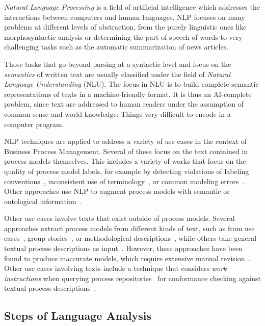 \emph{Natural Language Processing} is a field of artificial intelligence which
addresses the interactions between computers and human languages. NLP focuses on
many problems at different levels of abstraction, from the purely linguistic
ones like morphosyntactic analysis or determining the part-of-speech of words
to very challenging tasks such as the automatic summarization of news articles.

Those tasks that go beyond parsing at a syntactic level and focus on the
\emph{semantics} of written text are usually classified under the field of
\emph{Natural Language Understanding} (NLU). The focus in NLU is to build
complete semantic representations of texts in a machine-friendly format. It is
thus an AI-complete\cite{22, section 1 from TFM} problem, since text are
addressed to human readers under the assumption of common sense and world
knowledge: Things very difficult to encode in a computer program. 

NLP techniques are applied to address a variety of use cases in the context of
Business Process Management. Several of these focus on the text contained in
process models themselves. This includes a variety of works that focus on the
quality of process model labels, for example by detecting violations of labeling
conventions~\cite{becker2009,leopold2013detection,vandervos1997verification},
inconsistent use of terminology~\cite{koschmider2007}, or common modeling
errors~\cite{gruhn2011detecting}. Other approaches use NLP to augment process
models with semantic or ontological
information~\cite{leopold2015towards,francescomarino2009supporting,born2007userfriendly}.

Other use cases involve texts that exist outside of process models. Several
approaches extract process models from different kinds of text, such as from use
cases~\cite{sinha2010use}, group stories~\cite{gonccalves2009business}, or
methodological descriptions~\cite{epure2015automatic},  while others take
general textual process descriptions as
input~\cite{ghose2007process,friedrich2011process}. However,  these approaches
have been found to produce inaccurate models, which require extensive manual
revision~\cite{selway2015formalising}. Other use cases involving texts include a
technique that considers \textit{work instructions} when querying process
repositories~\cite{leopold2017searching} for conformance checking against
textual process descriptions~\cite{vanderaa2018checking}.


\subsection{Steps of Language Analysis}

